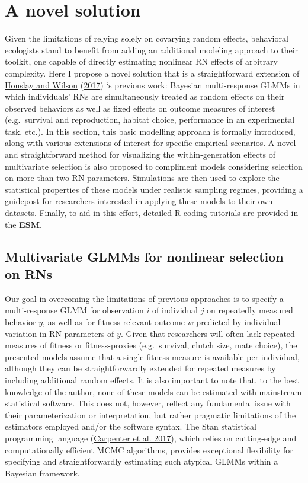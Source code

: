 \documentclass{article}
\begin{document}
\hypertarget{a-novel-solution}{%
\section{A novel solution}\label{a-novel-solution}}

Given the limitations of relying solely on covarying random effects,
behavioral ecologists stand to benefit from adding an additional
modeling approach to their toolkit, one capable of directly estimating
nonlinear RN effects of arbitrary complexity. Here I propose a novel
solution that is a straightforward extension of
\protect\hyperlink{ref-Hous2017}{Houslay and Wilson}
(\protect\hyperlink{ref-Hous2017}{2017}) `s previous work: Bayesian
multi-response GLMMs in which individuals' RNs are simultaneously
treated as random effects on their observed behaviors as well as fixed
effects on outcome measures of interest (e.g.~survival and reproduction,
habitat choice, performance in an experimental task, etc.). In this
section, this basic modelling approach is formally introduced, along
with various extensions of interest for specific empirical scenarios. A
novel and straightforward method for visualizing the within-generation
effects of multivariate selection is also proposed to compliment models
considering selection on more than two RN parameters. Simulations are
then used to explore the statistical properties of these models under
realistic sampling regimes, providing a guidepost for researchers
interested in applying these models to their own datasets. Finally, to
aid in this effort, detailed R coding tutorials are provided in the
\textbf{ESM}.

\hypertarget{multivariate-glmms-for-nonlinear-selection-on-rns}{%
\subsection{Multivariate GLMMs for nonlinear selection on
RNs}\label{multivariate-glmms-for-nonlinear-selection-on-rns}}

Our goal in overcoming the limitations of previous approaches is to
specify a multi-response GLMM for observation \(i\) of individual \(j\)
on repeatedly measured behavior \(y\), as well as for fitness-relevant
outcome \(w\) predicted by individual variation in RN parameters of
\(y\). Given that researchers will often lack repeated measures of
fitness or fitness-proxies (e.g.~survival, clutch size, mate choice),
the presented models assume that a single fitness measure is available
per individual, although they can be straightforwardly extended for
repeated measures by including additional random effects. It is also
important to note that, to the best knowledge of the author, none of
these models can be estimated with mainstream statistical software. This
does not, however, reflect any fundamental issue with their
parameterization or interpretation, but rather pragmatic limitations of
the estimators employed and/or the software syntax. The Stan statistical
programming language (\protect\hyperlink{ref-Stan}{Carpenter et al.
2017}), which relies on cutting-edge and computationally efficient MCMC
algorithms, provides exceptional flexibility for specifying and
straightforwardly estimating such atypical GLMMs within a Bayesian
framework.
\end{document}
